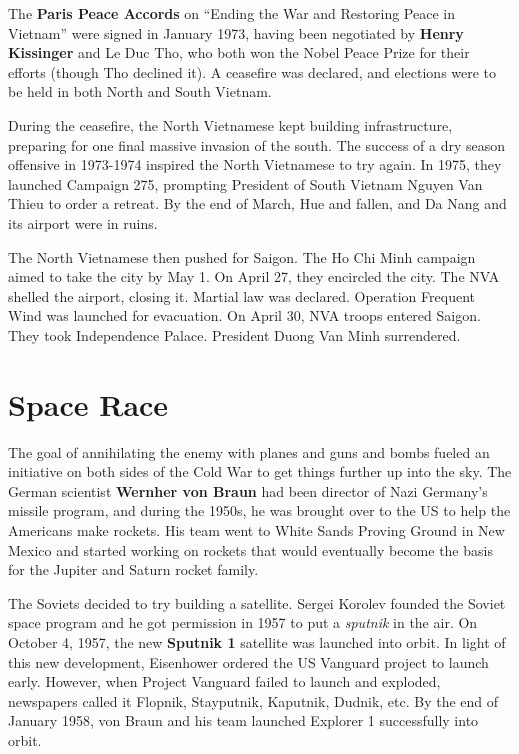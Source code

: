 The \textbf{Paris Peace Accords} on ``Ending the War and Restoring Peace in Vietnam'' were signed in January 1973,
having been negotiated by \textbf{Henry Kissinger} and Le Duc Tho,
who both won the Nobel Peace Prize for their efforts (though Tho declined it).
A ceasefire was declared, and elections were to be held in both North and South Vietnam.

During the ceasefire, the North Vietnamese kept building infrastructure,
preparing for one final massive invasion of the south.
The success of a dry season offensive in 1973-1974 inspired the North Vietnamese to try again.
In 1975, they launched Campaign 275, prompting President of South Vietnam Nguyen Van Thieu to order a retreat.
By the end of March, Hue and fallen, and Da Nang and its airport were in ruins.

The North Vietnamese then pushed for Saigon.
The Ho Chi Minh campaign aimed to take the city by May 1.
On April 27, they encircled the city.
The NVA shelled the airport, closing it.
Martial law was declared.
Operation Frequent Wind was launched for evacuation.
On April 30, NVA troops entered Saigon.
They took Independence Palace.
President Duong Van Minh surrendered.

\section{Space Race}

The goal of annihilating the enemy with planes and guns and bombs
fueled an initiative on both sides of the Cold War to get things further up into the sky.
The German scientist \textbf{Wernher von Braun} had been director of Nazi Germany's missile program,
and during the 1950s, he was brought over to the US to help the Americans make rockets.
His team went to White Sands Proving Ground in New Mexico and started working on rockets
that would eventually become the basis for the Jupiter and Saturn rocket family.

The Soviets decided to try building a satellite.
Sergei Korolev founded the Soviet space program and he got permission in 1957 to put a \textit{sputnik} in the air.
On October 4, 1957, the new \textbf{Sputnik 1} satellite was launched into orbit.
In light of this new development, Eisenhower ordered the US Vanguard project to launch early.
However, when Project Vanguard failed to launch and exploded,
newspapers called it Flopnik, Stayputnik, Kaputnik, Dudnik, etc.
By the end of January 1958, von Braun and his team launched Explorer 1 successfully into orbit.

